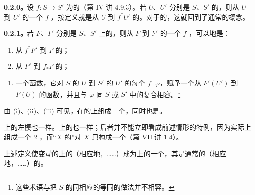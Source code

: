 \textbf{0.2.0。}设 $f:S\to S'$ 为的（第 IV 讲 4.9.3）。若 $U$、$U'$ 分别是 $S$、$S'$ 的，则从 $U$ 到 $U'$ 的一个 $f$-，按定义就是从 $U$ 到 $f^*U'$ 的。对于的，这就回到了通常的概念。

\textbf{0.2.1。}若 $F$、$F'$ 分别是 $S$、$S'$ 上的，则从 $F$ 到 $F'$ 的一个 $f$-，可以地是：
\begin{enumerate}
\item[(i)] 从 $f^*F'$ 到 $F$ 的；
\item[(ii)] 从 $F'$ 到 $f_*F$ 的；
\end{enumerate}
\begin{enumerate}
\item[(iii)] 一个函数，它对 $S$ 的 $U$ 到 $S'$ 的 $U'$ 的每个 $f$- $\varphi$，赋予一个从 $F'(U')$ 到 $F(U)$ 的函数，并且与 $\varphi$ 同 $S$ 或 $S'$ 中的复合相容。\footnote{这些术语与把 $S$ 的同相应的等同的做法并不相容。}
\end{enumerate}
由 (i)、(ii)、(iii) 可见，在的上组成一个，同时也是。

上的左模也一样。上的也一样；后者并不能立即看成前述情形的特例，因为实际上组成一个 $2$-，而“$X$ 的”对 $X$ 只构成一个（第 VII 讲 1.4）。

上述定义使变动的上的（相应地，……）成为上的一个，其是通常的（相应地，……）的。

